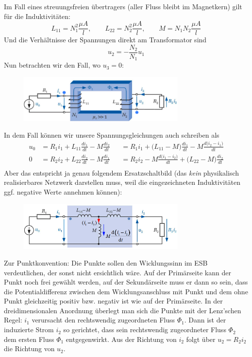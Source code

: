 Im Fall eines streuungsfreien übertragers (aller Fluss bleibt im Magnetkern) gilt für die Induktivitäten:
$$ L_{11}= N_1^2\frac{\mu A}{l}, \qquad L_{22}= N_2^2\frac{\mu A}{l}, \qquad M = N_1N_2 \frac{\mu A}{l}$$
Und die Verhältnisse der Spannungen direkt am Transformator sind
$$u_2 =-\frac{N_2}{N_1}u_1$$
Nun betrachten wir den Fall, wo $u_3=0$:
\begin{figure}[H]
\center
\includegraphics[width=0.75\textwidth]{img/Tra3}
\vspace{-0.2cm}
\end{figure}
In dem Fall können wir unsere Spannungsgleichungen auch schreiben als
 \begin{equation*}
\begin{alignedat}{2}
u_0 &= R_1i_1 + L_{11}\frac{di_1}{dt} - M\frac{di_2}{dt} &&= R_1i_1 + \big(L_{11}-M\big)\frac{di_1}{dt} - M \frac{d\big(i_2-i_1\big)}{dt}\\
0 &= R_2i_2 + L_{22}\frac{di_2}{dt} - M\frac{di_1}{dt} && = R_2i_2 - M \frac{d\big(i_1-i_2\big)}{dt} + \big(L_{22}-M\big) \frac{di_2}{dt} \\
\end{alignedat}
\end{equation*}
Aber das entspricht ja genau folgendem Ersatzschaltbild (das \textit{kein} physikalisch realisierbares Netzwerk darstellen muss, weil die eingezeichneten Induktivitäten ggf. negative Werte annehmen können):
\begin{figure}[H]
\center
\includegraphics[width=0.75\textwidth]{img/Tra4}
\vspace{-0.2cm}
\end{figure}
Zur Punktkonvention: \newline
Die Punkte sollen den Wicklungssinn im ESB verdeutlichen, der sonst nicht ersichtlich wäre.
Auf der Primärseite kann der Punkt noch frei gewählt werden, auf der Sekundärseite muss er dann so sein, dass die Potentialdifferenz zwischen dem Wicklungsanschluss mit Punkt und dem ohne Punkt gleichzeitig positiv bzw. negativ ist wie auf der Primärseite. \newline
In der dreidimensionalen Anordnung überlegt man sich die Punkte mit der Lenz'schen Regel: $i_1$ verursacht den rechtswendig zugeordneten Fluss $\Phi_1$. Dann ist der induzierte Strom $i_2$ so gerichtet, dass sein rechtswendig zugeordneter Fluss $\Phi_2$ dem ersten Fluss $\Phi_1$ entgegenwirkt. Aus der Richtung von $i_2$ folgt über $u_2 = R_2 i_2$ die Richtung von $u_2$.\newline

